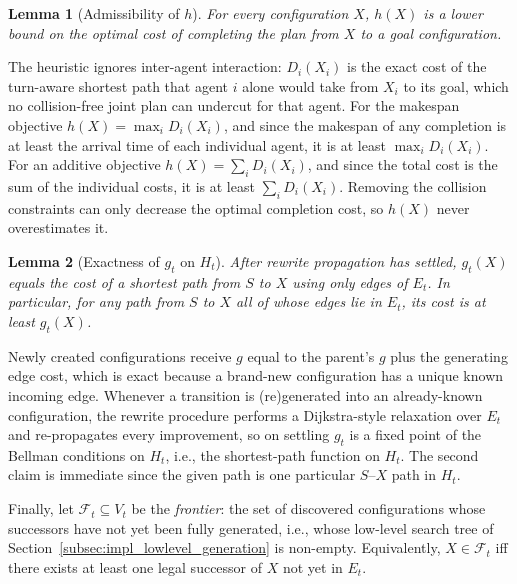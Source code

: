 \documentclass[lettersize,journal]{IEEEtran}
\makeatletter
\newtheorem{lemma}{\textbf{Lemma}}
\renewenvironment{proof}[1][\proofname]{\par
  \pushQED{\qed}%
  \normalfont \topsep6\p@\@plus6\p@\relax
  \trivlist
  \item[\hskip\parindent
        \itshape
    #1\@addpunct{.}]\ignorespaces
}{%
  \popQED\endtrivlist\@endparpenalty\z@
}
\makeatother
\begin{document}
\begin{lemma}[Admissibility of $h$]
\label{lem:admissible}
For every configuration $X$, $h(X)$ is a lower bound on the optimal cost of completing the plan from $X$ to a goal configuration.
\end{lemma}
\begin{proof}
The heuristic ignores inter-agent interaction: $D_i(X_i)$ is the exact cost of the turn-aware shortest path that agent $i$ alone would take from $X_i$ to its goal, which no collision-free joint plan can undercut for that agent. For the makespan objective $h(X)=\max_i D_i(X_i)$, and since the makespan of any completion is at least the arrival time of each individual agent, it is at least $\max_i D_i(X_i)$. For an additive objective $h(X)=\sum_i D_i(X_i)$, and since the total cost is the sum of the individual costs, it is at least $\sum_i D_i(X_i)$. Removing the collision constraints can only decrease the optimal completion cost, so $h(X)$ never overestimates it.
\end{proof}

\begin{lemma}[Exactness of $g_t$ on $H_t$]
\label{lem:gexact}
After rewrite propagation has settled, $g_t(X)$ equals the cost of a shortest path from $S$ to $X$ using only edges of $E_t$. In particular, for any path from $S$ to $X$ all of whose edges lie in $E_t$, its cost is at least $g_t(X)$.
\end{lemma}
\begin{proof}
Newly created configurations receive $g$ equal to the parent's $g$ plus the generating edge cost, which is exact because a brand-new configuration has a unique known incoming edge. Whenever a transition is (re)generated into an already-known configuration, the rewrite procedure performs a Dijkstra-style relaxation over $E_t$ and re-propagates every improvement, so on settling $g_t$ is a fixed point of the Bellman conditions on $H_t$, i.e., the shortest-path function on $H_t$. The second claim is immediate since the given path is one particular $S$--$X$ path in $H_t$.
\end{proof}

Finally, let $\mathcal{F}_t\subseteq V_t$ be the \emph{frontier}: the set of discovered configurations whose successors have not yet been fully generated, i.e., whose low-level search tree of Section~\ref{subsec:impl_lowlevel_generation} is non-empty. Equivalently, $X\in\mathcal{F}_t$ iff there exists at least one legal successor of $X$ not yet in $E_t$.
\end{document}

